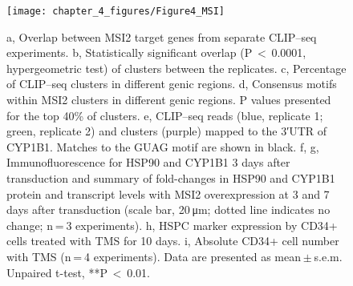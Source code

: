 \begin{figure}[ht]
  \centering
  \texttt{[image: chapter\_4\_figures/Figure4\_MSI]}
  \caption[Figure 3. MSI2 overexpression post-transcriptionally downregulates AHR pathway components]{a, Overlap between MSI2 target genes from separate CLIP–seq experiments. b, Statistically significant overlap (P $<$ 0.0001, hypergeometric test) of clusters between the replicates. c, Percentage of CLIP–seq clusters in different genic regions. d, Consensus motifs within MSI2 clusters in different genic regions. P values presented for the top 40\% of clusters. e, CLIP–seq reads (blue, replicate 1; green, replicate 2) and clusters (purple) mapped to the 3′UTR of CYP1B1. Matches to the GUAG motif are shown in black. f, g, Immunofluorescence for HSP90 and CYP1B1 3 days after transduction and summary of fold-changes in HSP90 and CYP1B1 protein and transcript levels with MSI2 overexpression at 3 and 7 days after transduction (scale bar, 20 μm; dotted line indicates no change; n = 3 experiments). h, HSPC marker expression by CD34+ cells treated with TMS for 10 days. i, Absolute CD34+ cell number with TMS (n = 4 experiments). Data are presented as mean $\pm$ s.e.m. Unpaired t-test, **P $<$ 0.01.}
  \label{fig:Figure_3}
\end{figure}

